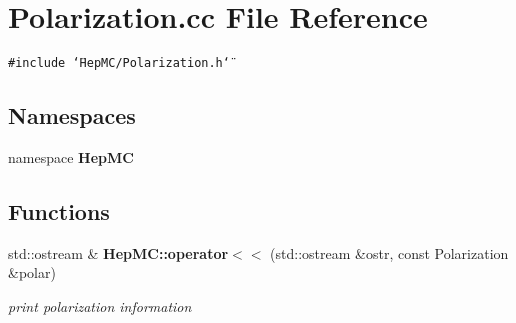 \section{Polarization.cc File Reference}
\label{Polarization_8cc}
{\tt \#include \char`\"{}Hep\-MC/Polarization.h\char`\"{}}\par
\subsection*{Namespaces}
\begin{CompactItemize}
\item 
namespace {\bf Hep\-MC}
\end{CompactItemize}
\subsection*{Functions}
\begin{CompactItemize}
\item 
std::ostream \& {\bf Hep\-MC::operator$<$$<$} (std::ostream \&ostr, const Polarization \&polar)
\begin{CompactList}\small\item\em print polarization information \item\end{CompactList}\end{CompactItemize}
